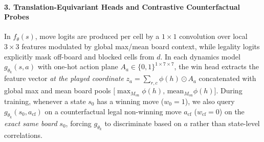 \documentclass[preprint,3p,times]{elsarticle}
\begin{document}
\paragraph{3. Translation-Equivariant Heads and Contrastive Counterfactual Probes}
In $f_\theta(s)$, move logits are produced per cell by a $1\times 1$ convolution over local $3\times 3$ features modulated by global max/mean board context, while legality logits explicitly mask off-board and blocked cells from $d$. In each dynamics model $g_{\theta_k}(s, a)$ with one-hot action plane $A_a \in \{0,1\}^{1\times 7\times 7}$, the win head extracts the feature vector \emph{at the played coordinate} $z_a = \sum_{r,c} \phi(h) \odot A_a$ concatenated with global max and mean board pools $\big[\max_{M_{\text{on}}} \phi(h),\, \mathrm{mean}_{M_{\text{on}}} \phi(h)\big]$. During training, whenever a state $s_0$ has a winning move ($w_0 = 1$), we also query $g_{\theta_k}(s_0, a_{\text{cf}})$ on a counterfactual legal non-winning move $a_{\text{cf}}$ ($w_{\text{cf}} = 0$) on the \emph{exact same board} $s_0$, forcing $g_{\theta_k}$ to discriminate based on $a$ rather than state-level correlations.
\end{document}
